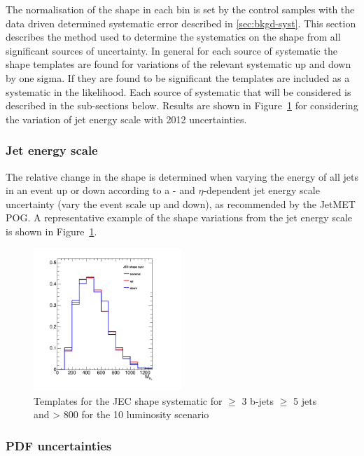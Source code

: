 The normalisation of the \mht shape in each \scalht bin is set by the control
samples with the data driven determined systematic error described in \ref{sec:bkgd-syst}.
This section describes the method used to determine the systematics on the shape
from all significant sources of uncertainty. In general for each source of systematic
the shape templates are found for variations of the relevant systematic up and down by 
one sigma. If they are found to be significant the templates are included as a systematic in the likelihood. 
Each source of systematic that will be considered is described in the sub-sections below. 
Results are shown in Figure~\ref{fig:jec-shape} for considering the variation of jet energy scale with 2012 uncertainties.

\subsubsection{Jet energy scale\label{sec:sms-syst-jes}}
The relative change in the \mht shape is
determined when varying the energy of all jets in an event up or down
according to a \pt- and $\eta$-dependent jet energy scale uncertainty
(\ie vary the event scale up and down), as recommended by the JetMET
POG. A representative example of the shape variations from the jet energy scale 
is shown in Figure~\ref{fig:jec-shape}.

\begin{figure}[]
  \centering
  \includegraphics[width=0.5\textwidth]{figures/closureTests/mhtJetSyst_SMS_T1bbbb_2J_mGl1000_mLSP900_JEC_ge3b_ge5j_800_1600.png}
  \caption{\label{fig:jec-shape} Templates for the JEC shape systematic for $\geq$ 3 b-jets $\geq$ 5 jets and \scalht > 800 for the 10 \ifb luminosity scenario}
\end{figure}

\subsubsection{PDF uncertainties\label{sec:pdf-sets}}

